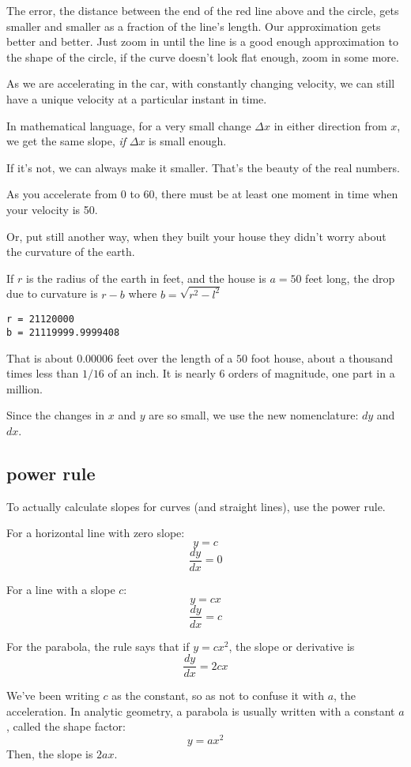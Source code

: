 \documentclass[11pt, oneside]{article}
\begin{document}
The error, the distance between the end of the red line above and the circle, gets smaller and smaller as a fraction of the line's length.  Our approximation gets better and better.  Just zoom in until the line is a good enough approximation to the shape of the circle, if the curve doesn't look flat enough, zoom in some more.

As we are accelerating in the car, with constantly changing velocity, we can still have a unique velocity at a particular instant in time.

In mathematical language, for a very small change $\Delta x$ in either direction from $x$, we get the same slope, \emph{if} $\Delta x$ is small enough. 

If it's not, we can always make it smaller.  That's the beauty of the real numbers.

As you accelerate from 0 to 60, there must be at least one moment in time when your velocity is 50. 

Or, put still another way, when they built your house they didn't worry about the curvature of the earth.

If $r$ is the radius of the earth in feet, and the house is $a = 50$ feet long, the drop due to curvature is $r - b$ where $b = \sqrt{r^2 - l^2}$

\begin{verbatim}
r = 21120000
b = 21119999.9999408
\end{verbatim}

That is about $0.00006$ feet over the length of a $50$ foot house, about a thousand times less than $1/16$ of an inch.  It is nearly 6 orders of magnitude, one part in a million.

Since the changes in $x$ and $y$ are so small, we use the new nomenclature:  $dy$ and $dx$.

\subsection*{power rule}
To actually calculate slopes for curves (and straight lines), use the power rule.

For a horizontal line with zero slope:
\[ y = c \]
\[ \frac{dy}{dx} = 0 \]

For a line with a slope $c$:
\[ y = cx \]
\[ \frac{dy}{dx} = c \]

For the parabola, the rule says that if $y = cx^2$, the slope or derivative is
\[ \frac{dy}{dx} = 2cx \]

We've been writing $c$ as the constant, so as not to confuse it with $a$, the acceleration.  In analytic geometry, a parabola is usually written with a constant $a$, called the shape factor:
\[ y = ax^2 \]
Then, the slope is $2ax$.  
\end{document}
